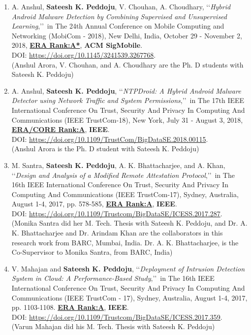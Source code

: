 \begin{enumerate}
		\item
	A. Anshul, \textbf{Sateesh K. Peddoju}, V. Chouhan, A. Choudhary, \lq\lq \textit{Hybrid Android Malware Detection by Combining Supervised and Unsupervised Learning},\rq\rq\, in The 24th Annual Conference on Mobile Computing and Networking (MobiCom - 2018), New Delhi, India, October 29 - November 2, 2018, \underline{\textbf{ERA Rank:A*}}, \textbf{ACM SigMobile}. \\DOI: \url{https://doi.org/10.1145/3241539.3267768}. \\ (Anshul Arora, V. Chouhan, and A. Choudhary are the Ph. D students with Sateesh K. Peddoju)

	
	\item
	A. Anshul, \textbf{Sateesh K. Peddoju}, \lq\lq \textit{NTPDroid: A Hybrid Android Malware Detector using Network Traffic and System Permissions},\rq\rq\, in The 17th IEEE International Conference On Trust, Security And Privacy In Computing And Communications (IEEE TrustCom-18), New York, July 31 - August 3, 2018, \underline{\textbf{ERA/CORE Rank:A}}, \textbf{IEEE}. \\DOI: \url{https://doi.org/10.1109/TrustCom/BigDataSE.2018.00115}. \\ (Anshul Arora is the Ph. D student with Sateesh K. Peddoju)
	
	\item
	M. Santra, \textbf{Sateesh K. Peddoju}, A. K. Bhattacharjee, and A. Khan, \lq\lq \textit{Design and Analysis of a Modified Remote Attestation Protocol},\rq\rq\, in The 16th IEEE International Conference On Trust, Security And Privacy In Computing And Communications (IEEE TrustCom-17), Sydney, Australia, August 1-4, 2017,  pp. 578-585, \underline{\textbf{ERA Rank:A}}, \textbf{IEEE}. \\DOI: \url{https://doi.org/10.1109/Trustcom/BigDataSE/ICESS.2017.287}.	\\(Monika Santra did her M. Tech. Thesis with Sateesh K. Peddoju, and Dr. A. K. Bhattacharjee and Dr. Arindam Khan are the collaborators in this research work from BARC, Mumbai, India. Dr. A. K. Bhattacharjee, is the Co-Supervisor to Monika Santra, from BARC, India)

		
	\item
	V. Mahajan and \textbf{Sateesh K. Peddoju}, \lq\lq \textit{Deployment of Intrusion Detection System in Cloud: A Performance-Based Study},\rq\rq\,  in The 16th IEEE International Conference On Trust, Security And Privacy In Computing And Communications (IEEE TrustCom - 17), Sydney, Australia, August 1-4, 2017,  pp. 1103-1108. \underline{\textbf{ERA Rank:A}}, \textbf{IEEE}. \\ DOI: \url{https://doi.org/10.1109/Trustcom/BigDataSE/ICESS.2017.359}. \\(Varun Mahajan did his M. Tech. Thesis with Sateesh K. Peddoju)


\end{enumerate}
